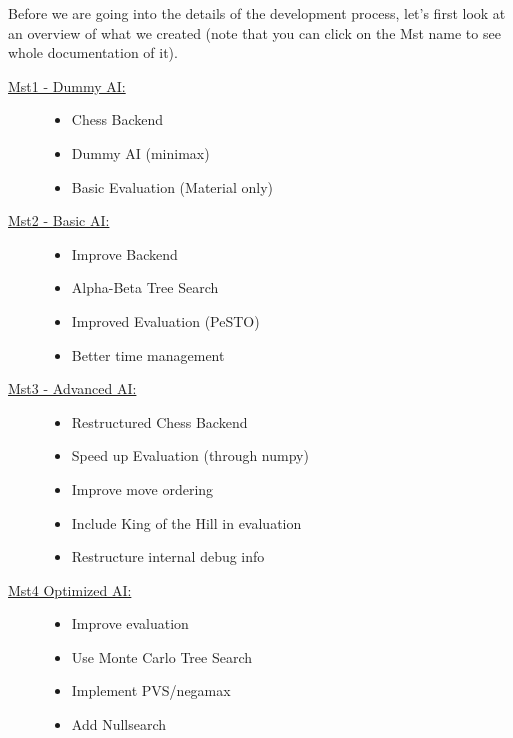 Before we are going into the details of the
development process, let's first look at
an overview of what we created
(note that you can click on the Mst name to see
whole documentation of it).

\begin{description}
  \item[\href{https://github.com/PraxTube/chess-ai/tree/master/docs/milestones/1-dummy-AI}{Mst1 - Dummy AI:}] \hfill
    \begin{itemize}
      \item Chess Backend
      \item Dummy AI (minimax)
      \item Basic Evaluation (Material only)
    \end{itemize}
  \item[\href{https://github.com/PraxTube/chess-ai/tree/master/docs/milestones/2-basic-AI}{Mst2 - Basic AI:}] \hfill
    \begin{itemize}
      \item Improve Backend
      \item Alpha-Beta Tree Search
      \item Improved Evaluation (PeSTO)
      \item Better time management
    \end{itemize}
  \item[\href{https://github.com/PraxTube/chess-ai/tree/master/docs/milestones/3-advanced-AI}{Mst3 - Advanced AI:}] \hfill
    \begin{itemize}
      \item Restructured Chess Backend
      \item Speed up Evaluation (through numpy)
      \item Improve move ordering
      \item Include King of the Hill in evaluation
      \item Restructure internal debug info
    \end{itemize}
  \item[\href{https://github.com/PraxTube/chess-ai/tree/master/docs/milestones/4-optimized-AI}{Mst4 Optimized AI:}] \hfill
    \begin{itemize}
      \item Improve evaluation
      \item Use Monte Carlo Tree Search
      \item Implement PVS/negamax
      \item Add Nullsearch
    \end{itemize}
\end{description}

